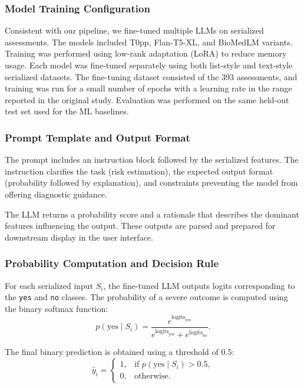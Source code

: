 \subsubsection{Model Training Configuration}
Consistent with our pipeline, we fine-tuned multiple LLMs on serialized assessments. The models included T0pp, Flan-T5-XL, and BioMedLM variants. Training was performed using low-rank adaptation (LoRA) to reduce memory usage. Each model was fine-tuned separately using both list-style and text-style serialized datasets. The fine-tuning dataset consisted of the 393 assessments, and training was run for a small number of epochs with a learning rate in the range reported in the original study. Evaluation was performed on the same held-out test set used for the ML baselines.

\subsubsection{Prompt Template and Output Format}
The prompt includes an instruction block followed by the serialized features. The instruction clarifies the task (risk estimation), the expected output format (probability followed by explanation), and constraints preventing the model from offering diagnostic guidance.

The LLM returns a probability score and a rationale that describes the dominant features influencing the output. These outputs are parsed and prepared for downstream display in the user interface.

\subsubsection{Probability Computation and Decision Rule}
For each serialized input \( S_i \), the fine-tuned LLM outputs logits corresponding to the \texttt{yes} and \texttt{no} classes. The probability of a severe outcome is computed using the binary softmax function:
\[
p(\text{yes} \mid S_i) = 
\frac{e^{\text{logits}_{\text{yes}}}}
{e^{\text{logits}_{\text{yes}}} + e^{\text{logits}_{\text{no}}}}.
\]

The final binary prediction is obtained using a threshold of 0.5:
\[
\hat{y}_i =
\begin{cases}
1, & \text{if } p(\text{yes} \mid S_i) > 0.5, \\
0, & \text{otherwise}.
\end{cases}
\]

